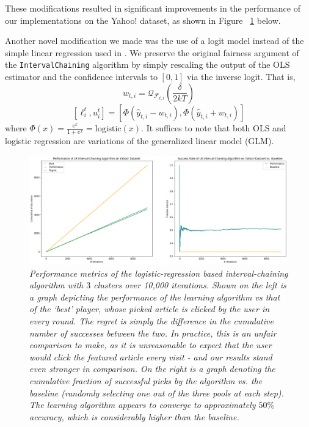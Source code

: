 \documentclass[11pt]{article}
\begin{document}
These modifications resulted in significant improvements in the performance of our implementations on the Yahoo! dataset, as shown in Figure ~\ref{fig:yahoo} below.

Another novel modification we made was the use of a logit model instead of the simple linear regression used in . We preserve the original fairness argument of the \texttt{IntervalChaining} algorithm by simply rescaling the output of the OLS estimator and the confidence intervals to $[0, 1]$ via the inverse logit. That is,
$$w_{t,i} = \mathcal{Q}_{\mathcal{F}_{t,i}}(\frac{\delta}{2kT})$$
$$[\ell_{i}^{t}, u_{i}^{t}] = [\Phi(\hat{y}_{t,i} - w_{t,i}), \Phi(\hat{y}_{t,i} + w_{t,i})]$$
where $\Phi(x) = \frac{e^{x}}{1 + e^{x}} = \text{logistic}(x)$. It suffices to note that both OLS and logistic regression are variations of the generalized linear model (GLM).

\begin{figure}
\includegraphics[width=\textwidth]{yahoo-interval-chaining.png}
\caption{\emph{Performance metrics of the logistic-regression based interval-chaining algorithm with $3$ clusters over 10,000 iterations. Shown on the left is a graph depicting the performance of the learning algorithm vs that of the `best' player, whose picked article is clicked by the user in every round. The regret is simply the difference in the cumulative number of successes between the two. In practice, this is an unfair comparison to make, as it is unreasonable to expect that the user would click the featured article every visit - and our results stand even stronger in comparison. On the right is a graph denoting the cumulative fraction of successful picks by the algorithm vs. the baseline (randomly selecting one out of the three pools at each step). The learning algorithm appears to converge to approximately $50\%$ accuracy, which is considerably higher than the baseline.} \label{fig:yahoo}}
\end{figure}
\end{document}
